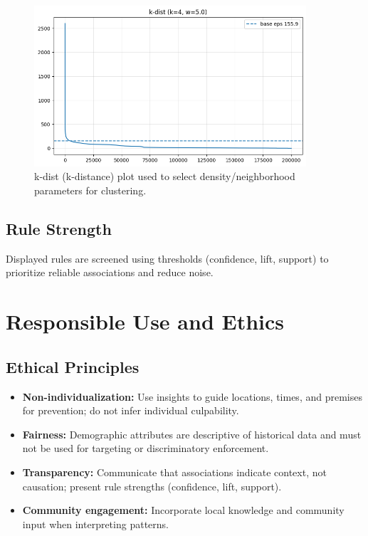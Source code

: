 \documentclass[11pt]{article}
\begin{document}
\begin{figure}[H]
  \centering
  \includegraphics[width=0.9\textwidth]{k-dist.png}
  \caption{k-dist (k-distance) plot used to select density/neighborhood parameters for clustering.}
\end{figure}

\subsection{Rule Strength}
Displayed rules are screened using thresholds (confidence, lift, support) to prioritize reliable associations and reduce noise.

\section{Responsible Use and Ethics}

\subsection{Ethical Principles}
\begin{itemize}[leftmargin=*]
  \item \textbf{Non-individualization:} Use insights to guide locations, times, and premises for prevention; do not infer individual culpability.
  \item \textbf{Fairness:} Demographic attributes are descriptive of historical data and must not be used for targeting or discriminatory enforcement.
  \item \textbf{Transparency:} Communicate that associations indicate context, not causation; present rule strengths (confidence, lift, support).
  \item \textbf{Community engagement:} Incorporate local knowledge and community input when interpreting patterns.
\end{itemize}
\end{document}
